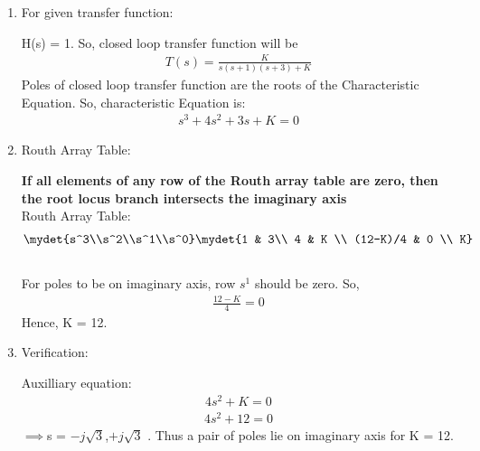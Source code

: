 \begin{enumerate}[label=\thesection.\arabic*.,ref=\thesection.\theenumi]
\item For given transfer function: 

    H(s) = 1. So, closed loop transfer function will be
    \begin{align}
        T(s) = \frac{K}{s(s+1)(s+3)+K}
    \end{align}
    Poles of closed loop transfer function are the roots of the Characteristic Equation.
    So, characteristic Equation is:
    \begin{align}
        s^3 + 4s^2 + 3s + K = 0
    \end{align}

\item Routh Array Table:

    \textbf{If all elements of any row of the Routh array table are zero, then the root locus branch intersects the imaginary axis}\\
    Routh Array Table:
    \begin{align}
        \mydet{s^3\\s^2\\s^1\\s^0}
        \mydet{1 & 3\\ 4 & K \\ (12-K)/4 & 0 \\ K}
    \end{align}\\
    For poles to be on imaginary axis, row $s^1$ should be zero. So,     
    \begin{align}
        \frac{12-K}{4} = 0
    \end{align}
    Hence, K = 12.

\item Verification: 

    Auxilliary equation:
    \begin{align}
        4s^2 + K = 0
    \end{align}
    \begin{align}
        4s^2 + 12 = 0
    \end{align}
    $\implies$s = $-j\sqrt{3}$,$+j\sqrt{3}$ .
    Thus a pair of poles lie on imaginary axis for K = 12.
   


\end{enumerate}
